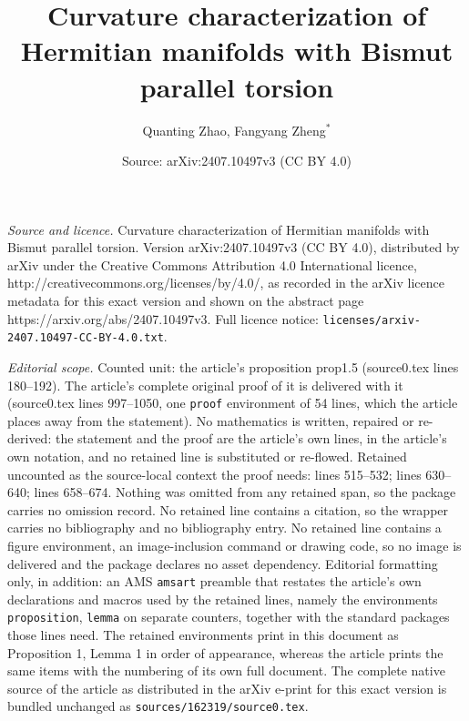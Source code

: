 \documentclass[10pt,a4paper]{amsart}
\title{Curvature characterization of Hermitian manifolds with Bismut parallel torsion}
\author{Quanting Zhao, Fangyang Zheng$^{\ast}$}
\date{Source: arXiv:2407.10497v3 (CC BY 4.0)}
\begin{document}
\maketitle

\noindent\emph{Source and licence.} Curvature characterization of Hermitian manifolds with Bismut parallel torsion. Version arXiv:2407.10497v3 (CC BY 4.0), distributed by arXiv under the Creative Commons Attribution 4.0 International licence, http://creativecommons.org/licenses/by/4.0/, as recorded in the arXiv licence metadata for this exact version and shown on the abstract page https://arxiv.org/abs/2407.10497v3. Full licence notice: \texttt{licenses/arxiv-2407.10497-CC-BY-4.0.txt}.\par\smallskip

\noindent\textit{Editorial scope.} Counted unit: the article's proposition prop1.5 (source0.tex lines 180--192). The article's complete original proof of it is delivered with it (source0.tex lines 997--1050, one \texttt{proof} environment of 54 lines, which the article places away from the statement). No mathematics is written, repaired or re-derived: the statement and the proof are the article's own lines, in the article's own notation, and no retained line is substituted or re-flowed.  Retained uncounted as the source-local context the proof needs: lines 515--532; lines 630--640; lines 658--674.  Nothing was omitted from any retained span, so the package carries no omission record.  No retained line contains a citation, so the wrapper carries no bibliography and no bibliography entry.  No retained line contains a figure environment, an image-inclusion command or drawing code, so no image is delivered and the package declares no asset dependency.  Editorial formatting only, in addition: an AMS \texttt{amsart} preamble that restates the article's own declarations and macros used by the retained lines, namely the environments \texttt{proposition}, \texttt{lemma} on separate counters, together with the standard packages those lines need.  The retained environments print in this document as Proposition 1, Lemma 1 in order of appearance, whereas the article prints the same items with the numbering of its own full document.  The complete native source of the article as distributed in the arXiv e-print for this exact version is bundled unchanged as \texttt{sources/162319/source0.tex}.
\end{document}
